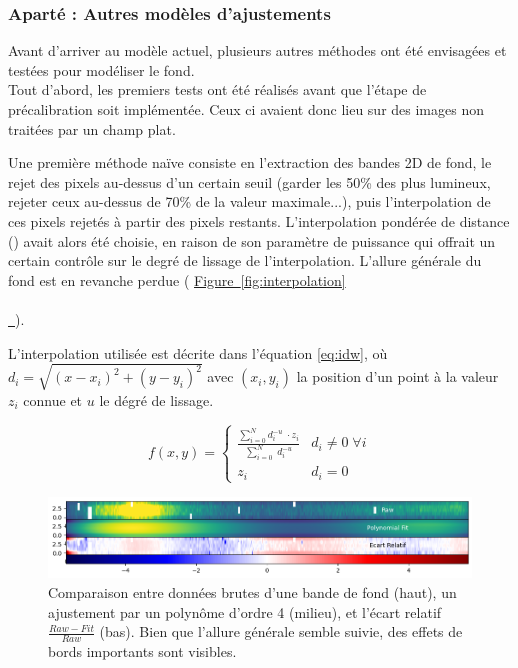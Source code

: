 \documentclass[12pt, a4paper]{article}
\newcommand*{\figref}[2][]{%
  \hyperref[{#2}]{%
    Figure~\ref*{#2}%
    \ifx\\#1\\%
    \else
      \,#1%
    \fi
  }%
}
\begin{document}
\subsubsection{Aparté : Autres modèles d'ajustements}

Avant d'arriver au modèle actuel, plusieurs autres méthodes ont été envisagées et testées pour modéliser le fond.\\

Tout d'abord, les premiers tests ont été réalisés avant que l'étape de précalibration soit implémentée. Ceux ci avaient donc lieu sur des images non traitées par un champ plat.

Une première méthode naïve consiste en l'extraction des bandes 2D de fond, le rejet des pixels au-dessus d'un certain seuil (garder les 50\% des plus lumineux, rejeter ceux au-dessus de 70\% de la valeur maximale...), puis l'interpolation de ces pixels rejetés à partir des pixels restants. L'interpolation pondérée de distance (\parencite{10.1145/800186.810616}) avait alors été choisie, en raison de son paramètre de puissance qui offrait un certain contrôle sur le degré de lissage de l'interpolation. L'allure générale du fond est en revanche perdue (\figref{fig:interpolation}).

L'interpolation utilisée est décrite dans l'équation \ref{eq:idw}, où $d_i = \sqrt{(x-x_i)^2 + (y-y_i)^2}$ avec $(x_i,y_i)$ la position d'un point à la valeur $z_i$ connue et $u$ le dégré de lissage.

\begin{equation}
  \label{eq:idw}
  f(x,y) = 
  \begin{cases}
    \frac{\sum_{i=0}^{N} d_i^{-u} \; \cdot z_i}{\sum_{i=0}^N \;d_i^{-u}} & d_i \neq 0 \; \forall i\\
    z_i & d_i = 0

  \end{cases}
\end{equation}

\begin{figure}[H]
  \centering
  \includegraphics[scale=0.72]{assets/2D_polynomial.png}
  \caption{Comparaison entre données brutes d'une bande de fond (haut), un ajustement par un polynôme d'ordre 4 (milieu), et l'écart relatif $\frac{Raw - Fit}{Raw}$ (bas). Bien que l'allure générale semble suivie, des effets de bords importants sont visibles.}
  \label{fig:2D_polynomial}
\end{figure}
\end{document}
